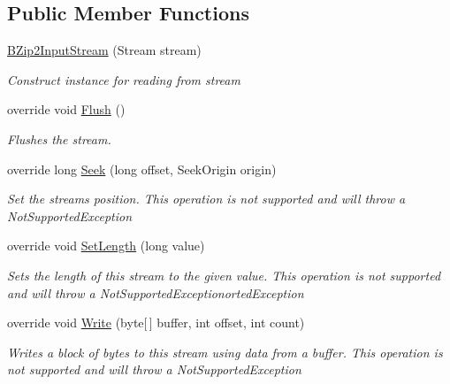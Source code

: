 \subsection*{Public Member Functions}
\begin{DoxyCompactItemize}
\item 
\hyperlink{class_i_c_sharp_code_1_1_sharp_zip_lib_1_1_b_zip2_1_1_b_zip2_input_stream_a11e9d5b3f44614e8cdc908401156aa74}{B\+Zip2\+Input\+Stream} (Stream stream)
\begin{DoxyCompactList}\small\item\em Construct instance for reading from stream \end{DoxyCompactList}\item 
override void \hyperlink{class_i_c_sharp_code_1_1_sharp_zip_lib_1_1_b_zip2_1_1_b_zip2_input_stream_a5fa2d7b4a991f9c870cc97a448f10a22}{Flush} ()
\begin{DoxyCompactList}\small\item\em Flushes the stream. \end{DoxyCompactList}\item 
override long \hyperlink{class_i_c_sharp_code_1_1_sharp_zip_lib_1_1_b_zip2_1_1_b_zip2_input_stream_a03df82487fd31e6f987adca7367ecb1b}{Seek} (long offset, Seek\+Origin origin)
\begin{DoxyCompactList}\small\item\em Set the streams position. This operation is not supported and will throw a Not\+Supported\+Exception \end{DoxyCompactList}\item 
override void \hyperlink{class_i_c_sharp_code_1_1_sharp_zip_lib_1_1_b_zip2_1_1_b_zip2_input_stream_af1566e0313f5d5b4561a632c36d26a34}{Set\+Length} (long value)
\begin{DoxyCompactList}\small\item\em Sets the length of this stream to the given value. This operation is not supported and will throw a Not\+Supported\+Exceptionorted\+Exception \end{DoxyCompactList}\item 
override void \hyperlink{class_i_c_sharp_code_1_1_sharp_zip_lib_1_1_b_zip2_1_1_b_zip2_input_stream_ad2397d4ed0c8dd9ee8ee7224e95b9fe9}{Write} (byte\mbox{[}$\,$\mbox{]} buffer, int offset, int count)
\begin{DoxyCompactList}\small\item\em Writes a block of bytes to this stream using data from a buffer. This operation is not supported and will throw a Not\+Supported\+Exception \end{DoxyCompactList}\item 

\end{DoxyCompactItemize}
